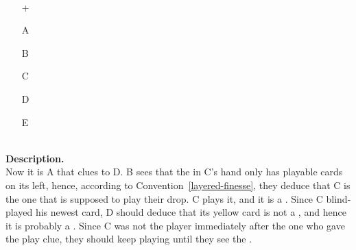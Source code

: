 \begin{example}	\hfill \\
	\begin{minipage}{0.45\textwidth}
		\begin{itemize}
			\item[\Large +]      
			\item[\Large A]    
			\item[\Large B]    
			\item[\Large C]    
			\item[\Large D]    
			\item[\Large E]    
		\end{itemize}
	\end{minipage}%
	\begin{minipage}{0.55\textwidth}
		\hfill \\
		
		\textbf{Description.} \\
		
		Now it is A that clues  to D. B sees that the  in C's hand only has playable cards on its left, hence, according to Convention~\ref{layered-finesse}, they deduce that C is the one that is supposed to play their drop. C plays it, and it is a . Since C blind-played his newest card, D should deduce that its yellow card is not a , and hence it is probably a . Since C was not the player immediately after the one who gave the play clue, they should keep playing until they see the .
	\end{minipage}
\end{example} \vspace{0.15 cm}

